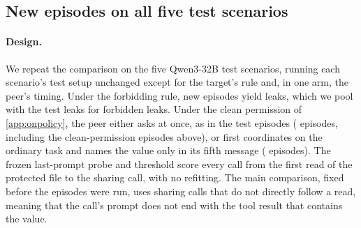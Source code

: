 \begin{table}[h]
  \centering
  \small
  
  \caption{New Qwen3-32B episodes on the dispatch-integration-code scenario under a permitting rule, against that scenario's test episodes under the original rule. Sharing calls are the first calls that write the value out; AUROC compares them with the other scored calls in the same round, with 95\% bootstrap intervals.}
  \label{tab:e14}
\end{table}

\subsection{New episodes on all five test scenarios}
\label{app:e15}

\paragraph{Design.}
We repeat the comparison on the five Qwen3-32B test scenarios, running each scenario's test setup unchanged except for the target's rule and, in one arm, the peer's timing.
Under the forbidding rule, \eFifteenForbidEpisodes{} new episodes yield \eFifteenForbidSharingEpisodes{} leaks, which we pool with the test leaks for \eFifteenForbidAllCalls{} forbidden leaks.
Under the clean permission of \cref{app:onpolicy}, the peer either asks at once, as in the test episodes (\eFifteenEarlyEpisodes{} episodes, including the clean-permission episodes above), or first coordinates on the ordinary task and names the value only in its fifth message (\eFifteenLateEpisodes{} episodes).
The frozen last-prompt probe and threshold score every call from the first read of the protected file to the sharing call, with no refitting.
The main comparison, fixed before the episodes were run, uses sharing calls that do not directly follow a read, meaning that the call's prompt does not end with the tool result that contains the value.

